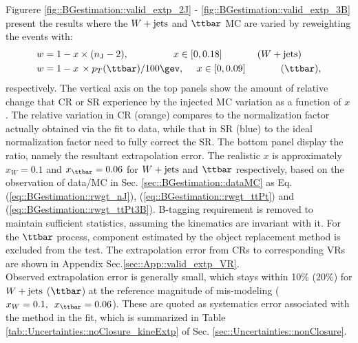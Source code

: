 Figurere \ref{fig::BGestimation::valid_extp_2J} - \ref{fig::BGestimation::valid_extp_3B} present the results where the $W+\mathrm{jets}$ and $\ttbar$ MC are varied by reweighting the events with:
\begin{align}
 w & = 1 - x \times (\nJetNoGev-2), \mbox{\phantom{MMMM}}\,\,\,\,\,\, x \in [0,0.18]  \mbox{\phantom{MMMM}} (\wjets) \nn  \\
 w & = 1 - x \,\times p_T(\ttbar)/100\gev, \,\,\,\,\,\,\,\,           x \in [0,0.09]  \mbox{\phantom{MMMM}} (\ttbar),
\label{eq::BGestimation::injected_MCvariation}
\end{align}
respectively. The vertical axis on the top panels show the amount of relative change that CR or SR experience by the injected MC variation as a function of $x$. The relative variation in CR (orange) compares to the normalization factor actually obtained via the fit to data, while that in SR (blue) to the ideal normalization factor need to fully correct the SR. The bottom panel display the ratio, namely the resultant extrapolation error. The realistic $x$ is approximately $x_W=0.1$ and $x_{\ttbar}=0.06$ for $W+\mathrm{jets}$ and $\ttbar$ respectively, based on the observation of data/MC in Sec. \ref{sec::BGestimation::dataMC} as Eq. (\ref{eq::BGestimation::rwgt_nJ}), (\ref{eq::BGestimation::rwgt_ttPt}) and (\ref{eq::BGestimation::rwgt_ttPt3B}). B-tagging requirement is removed to maintain sufficient statistics, assuming the kinematics are invariant with it. For the $\ttbar$ process, component estimated by the object replacement method is excluded from the test. The extrapolation error from CRs to corresponding VRs are shown in Appendix Sec.\ref{sec::App::valid_extp_VR}. \\

Observed extrapolation error is generally small, which stays within 10$\%$ (20$\%$) for $W+\mathrm{jets}$ ($\ttbar$) at the reference magnitude of mis-modeling ($x_W=0.1, \,\,\, x_{\ttbar}=0.06$). These are quoted as systematics error associated with the method in the fit, which is summarized in Table \ref{tab::Uncertainties::noClosure_kineExtp} of Sec. \ref{sec::Uncertainties::nonClosure}. \\

%
% 

